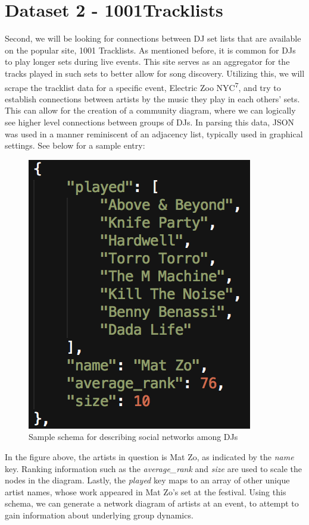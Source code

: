 \documentclass[12pt]{dalcsthesis}
\begin{document}
\section{Dataset 2 - 1001Tracklists}

Second, we will be looking for connections between DJ set lists that are available on the popular site, 1001 Tracklists. As mentioned before, it is common for DJs to play longer sets during live events. This site serves as an aggregator for the tracks played in such sets to better allow for song discovery. Utilizing this, we will scrape the tracklist data for a specific event, Electric Zoo NYC\textsuperscript{7}, and try to establish connections between artists by the music they play in each others' sets. This can allow for the creation of a community diagram, where we can logically see higher level connections between groups of DJs. In parsing this data, JSON was used in a manner reminiscent of an adjacency list, typically used in graphical settings. See below for a sample entry:\\

\begin{figure}[h]
\includegraphics[scale=.65]{ezoo_json}
\centering
\caption{Sample schema for describing social networks among DJs}
\end{figure}

In the figure above, the artists in question is Mat Zo, as indicated by the \textit{name} key. Ranking information such as the \textit{average\_rank} and \textit{size} are used to scale the nodes in the diagram. Lastly, the \textit{played} key maps to an array of other unique artist names, whose work appeared in Mat Zo's set at the festival. Using this schema, we can generate a network diagram of artists at an event, to attempt to gain information about underlying group dynamics.
\end{document}
